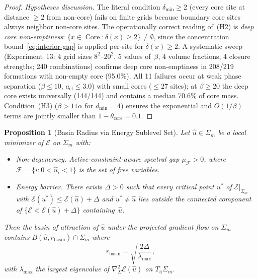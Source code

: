 \documentclass[lettersize,journal]{IEEEtran}
\newtheorem{proposition}[theorem]{Proposition}
\DeclareMathOperator{\Core}{Core}
\begin{document}
\begin{proof}
\medskip\noindent\emph{Hypotheses discussion.} The literal condition $\delta_{\min} \geq 2$ (every core site at distance $\geq 2$ from non-core) fails on finite grids because boundary core sites always neighbor non-core sites. The operationally correct reading of~(H2) is \emph{deep core non-emptiness}: $\{x \in \Core : \delta(x) \geq 2\} \neq \emptyset$, since the concentration bound~\eqref{eq:interior-gap} is applied per-site for $\delta(x) \geq 2$. A systematic sweep (Experiment~13: 4 grid sizes $8^2$--$20^2$, 5 values of~$\beta$, 4 volume fractions, 4 closure strengths; 240 combinations) confirms deep core non-emptiness in 208/219 formations with non-empty core (95.0\%). All 11 failures occur at weak phase separation ($\beta \leq 10$, $a_{\mathrm{cl}} \leq 3.0$) with small cores ($\leq 27$ sites); at $\beta \geq 20$ the deep core exists universally (144/144) and contains a median 70.6\% of core mass. Condition~(H3) ($\beta > 11\alpha$ for $d_{\min} = 4$) ensures the exponential and $O(1/\beta)$ terms are jointly smaller than $1 - \theta_{\mathrm{core}} = 0.1$.
\end{proof}

\begin{proposition}[Basin Radius via Energy Sublevel Set]
\label{prop:basin-radius}
Let $\hat{u} \in \Sigma_m$ be a local minimizer of $\mathcal{E}$ on $\Sigma_m$ with:
\begin{itemize}
\item[\emph{(B1)}] \emph{Non-degeneracy.} Active-constraint-aware spectral gap $\mu_{\mathcal{F}} > 0$, where $\mathcal{F} = \{i : 0 < \hat{u}_i < 1\}$ is the set of free variables.
\item[\emph{(B2)}] \emph{Energy barrier.} There exists $\Delta > 0$ such that every critical point $u^*$ of $\mathcal{E}|_{\Sigma_m}$ with $\mathcal{E}(u^*) \leq \mathcal{E}(\hat{u}) + \Delta$ and $u^* \neq \hat{u}$ lies outside the connected component of $\{\mathcal{E} < \mathcal{E}(\hat{u}) + \Delta\}$ containing~$\hat{u}$.
\end{itemize}
Then the basin of attraction of $\hat{u}$ under the projected gradient flow on $\Sigma_m$ contains $B(\hat{u}, r_{\mathrm{basin}}) \cap \Sigma_m$ where
\begin{equation}
\label{eq:basin-radius}
r_{\mathrm{basin}} = \sqrt{\frac{2\Delta}{\lambda_{\max}}},
\end{equation}
with $\lambda_{\max}$ the largest eigenvalue of $\nabla^2_\Sigma \mathcal{E}(\hat{u})$ on $T_{\hat{u}}\Sigma_m$.
\end{proposition}
\end{document}
